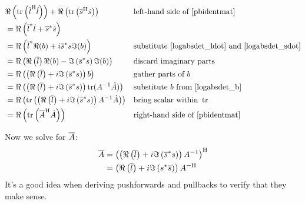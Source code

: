 \documentclass[../main.tex]{subfiles}
\begin{document}
\begin{refsection}
\begingroup
\allowdisplaybreaks
\begin{align*}
&\Re\left( \operatorname{tr}\left(
    {\overline{l}}^\mathrm{H} \dot{l}
\right) \right) +
\Re\left( \operatorname{tr}\left(
    {\overline{s}}^\mathrm{H} \dot{s}
\right) \right)
    && \text{left-hand side of } \eqref{pbidentmat}\\
&= \Re\left( 
       { \overline{l} }^* \dot{l} +
       { \overline{s} }^* \dot{s}
   \right) \\
&= \Re\left( 
       { \overline{l} }^* \Re(b) +
       i { \overline{s} }^* s \Im(b)
   \right)
       && \text{substitute } \eqref{logabsdet_ldot} \text{ and } \eqref{logabsdet_sdot} \\
&= \Re\left( 
       \Re\left( \overline{l} \right) \Re(b) -
       \Im \left(
           { \overline{s} }^* s
       \right) \Im(b)
   \right)
       && \text{discard imaginary parts} \\
&= \Re\left(
       \left(
           \Re \left( \overline{l} \right) +
           i \Im \left(
               { \overline{s} }^* s
           \right)
       \right) b
   \right)
       && \text{gather parts of } b \\
&= \Re\left(
       \left(
           \Re \left( \overline{l} \right) +
           i \Im \left(
               { \overline{s} }^* s
           \right)
       \right)
       \operatorname{tr}(A^{-1} \dot{A})
   \right)
       && \text{substitute } b \text{ from } \eqref{logabsdet_b} \\
&= \Re\left( \operatorname{tr} \left(
       \left(
           \Re \left( \overline{l} \right) +
           i \Im \left(
               { \overline{s} }^* s
           \right)
       \right)
       A^{-1} \dot{A}
   \right) \right)
       && \text{bring scalar within } \operatorname{tr} \\
&= \Re\left( \operatorname{tr} \left( {\overline{A}}^\mathrm{H} \dot{A} \right) \right)
       && \text{right-hand side of } \eqref{pbidentmat}\\
\end{align*}
\endgroup

Now we solve for $\overline{A}$:
\begin{align*}
\overline{A} &= {\left( \left(
    \Re \left( \overline{l} \right) +
    i \Im \left( { \overline{s} }^* s \right)
\right) A^{-1} \right)}^\mathrm{H}\\
&= \left(
    \Re \left( \overline{l} \right) +
    i \Im \left( { s }^* \overline{s} \right)
\right) {A}^{-\mathrm{H}}
\end{align*}
It's a good idea when deriving pushforwards and pullbacks to verify that they make sense.\footnotemark


\end{refsection}
\end{document}
